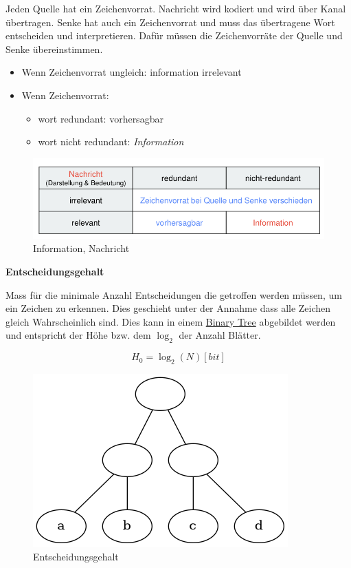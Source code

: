 \documentclass[11pt,twoside,twocolumn,landscape]{article}
\begin{document}
Jeden Quelle hat ein Zeichenvorrat.
Nachricht wird kodiert und wird über Kanal übertragen.
Senke hat auch ein Zeichenvorrat und muss das übertragene Wort entscheiden und interpretieren.
Dafür müssen die Zeichenvorräte der Quelle und Senke übereinstimmen.

\begin{itemize}
\item Wenn Zeichenvorrat ungleich: information irrelevant
\item Wenn Zeichenvorrat:
\begin{itemize}
\item wort redundant: vorhersagbar
\item wort nicht redundant: \emph{Information}
\end{itemize}
\end{itemize}


\begin{figure}[htbp]
\centering
\includegraphics[width=.9\linewidth]{img/informations_uebertragung_information.png}
\caption{\label{fig:orgfcbde7a}Information, Nachricht}
\end{figure}

\textbf{Entscheidungsgehalt}

Mass für die minimale Anzahl Entscheidungen die getroffen werden müssen, um ein Zeichen zu erkennen.
Dies geschieht unter der Annahme dass alle Zeichen gleich Wahrscheinlich sind.
Dies kann in einem \href{../../../roam/20210806225200-binary_tree.org}{Binary Tree} abgebildet werden und entspricht der Höhe bzw. dem \(\log_2\) der Anzahl Blätter.

\begin{equation}
H_0 = \log_2(N)[bit]
\end{equation}

\begin{figure}[htbp]
\centering
\includegraphics[width=.9\linewidth]{img/entscheidungsgehalt_tree.png}
\caption{\label{fig:org9422f21}Entscheidungsgehalt}
\end{figure}
\end{document}
